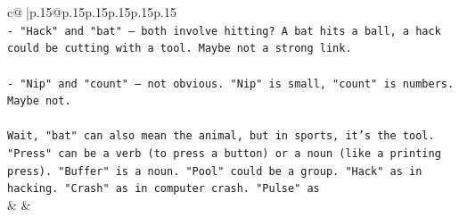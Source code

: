 \documentclass{article}
\begin{document}
{\begin{supertabular}{c@{$\;$}|p{.15\linewidth}@{}p{.15\linewidth}p{.15\linewidth}p{.15\linewidth}p{.15\linewidth}p{.15\linewidth}}
{{{\\ 
\texttt{{-} "Hack" and "bat" – both involve hitting? A bat hits a ball, a hack could be cutting with a tool. Maybe not a strong link.} \\
\\ 
\texttt{{-} "Nip" and "count" – not obvious. "Nip" is small, "count" is numbers. Maybe not.} \\
\\ 
\texttt{Wait, "bat" can also mean the animal, but in sports, it's the tool. "Press" can be a verb (to press a button) or a noun (like a printing press). "Buffer" is a noun. "Pool" could be a group. "Hack" as in hacking. "Crash" as in computer crash. "Pulse" as} \\
            }
        }
    }
    & & \\ \\


\end{supertabular}}
\end{document}
